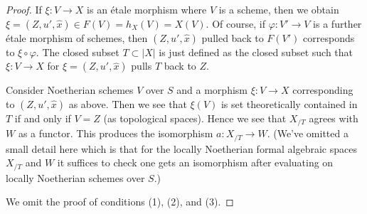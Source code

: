 \begin{proof}
\medskip\noindent
If $\xi : V \to X$ is an \'etale morphism where $V$ is a scheme, then
we obtain $\xi = (Z, u', \hat x) \in F(V) = h_X(V) = X(V)$.
Of course, if $\varphi : V' \to V$ is a further \'etale morphism of schemes,
then $(Z, u', \hat x)$ pulled back to $F(V')$ corresponds to
$\xi \circ \varphi$.
The closed subset $T \subset |X|$ is just defined as the closed
subset such that $\xi : V \to X$ for $\xi = (Z, u', \hat x)$
pulls $T$ back to $Z$.

\medskip\noindent
Consider Noetherian schemes $V$ over $S$ and a morphism
$\xi : V \to X$ corresponding to $(Z, u', \hat x)$ as above.
Then we see that $\xi(V)$ is set theoretically contained in $T$
if and only if $V = Z$ (as topological spaces). Hence we see that
$X_{/T}$ agrees with $W$ as a functor. This produces the isomorphism
$a : X_{/T} \to W$. (We've omitted a small detail here which is
that for the locally Noetherian formal algebraic spaces $X_{/T}$ and
$W$ it suffices to check one gets an isomorphism after evaluating
on locally Noetherian schemes over $S$.)

\medskip\noindent
We omit the proof of conditions (1), (2), and (3).
\end{proof}

